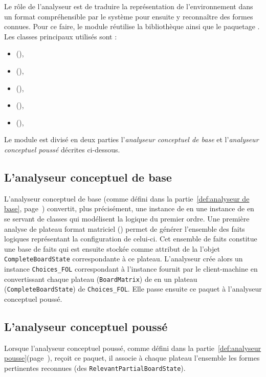 Le rôle de l'analyseur est de traduire la représentation de l'environnement dans un format compréhensible par le système pour ensuite y reconnaître des formes connues. Pour ce faire, le module réutilise la bibliothèque  ainsi que le paquetage . Les classes principaux utilisés sont :
\begin{itemize}
  \item {} (),
  \item {} (),
  \item {} (),
  \item {} (),
  \item {} (),
\end{itemize}
Le module est divisé en deux parties l'\emph{analyseur conceptuel de base} et l'\emph{analyseur conceptuel poussé} décrites ci-dessous.
 
\subsection{L'analyseur conceptuel de base}
L'analyseur conceptuel de base (comme défini dans la partie~\ref{def:analyseur de base}, page~\pageref{def:analyseur de base}) convertit, plus précisément, une instance de  en une instance de  en se servant de classes qui modélisent la logique du premier ordre. 
Une première analyse de plateau format matriciel () permet de générer l'ensemble des faits logiques représentant la configuration de celui-ci. Cet ensemble de faits constitue une base de faits qui est ensuite stockée comme attribut de la l'objet \texttt{CompleteBoardState} correspondante à ce plateau. L'analyseur crée alors un instance \texttt{Choices\_FOL} correspondant à l'instance  fournit par le \gls{client-machine} en convertissant chaque plateau (\texttt{BoardMatrix}) de  en un plateau (\texttt{CompleteBoardState}) de \texttt{Choices\_FOL}. Elle passe ensuite ce paquet à l'analyseur conceptuel poussé. 
\subsection{L'analyseur conceptuel poussé}
Lorsque l'analyseur conceptuel poussé, comme défini dans la partie~\ref{def:analyseur pousse}(page~\pageref{def:analyseur pousse}), reçoit ce paquet, il associe à chaque plateau l'ensemble les formes pertinentes reconnues (des \texttt{RelevantPartialBoardState}).


